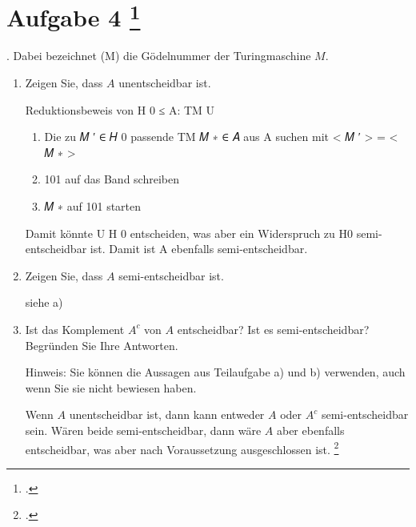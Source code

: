 \documentclass{lehramt-informatik-aufgabe}
\begin{document}
\section{Aufgabe 4
\footcite{examen:66115:2020:03}}


.
Dabei bezeichnet (M) die Gödelnummer der Turingmaschine $M$.
\begin{enumerate}


\item Zeigen Sie, dass $A$ unentscheidbar ist.

\begin{liAntwort}
Reduktionsbeweis von H 0 ≤ A:
TM U
\begin{enumerate}

\item Die zu 𝑀 ′ ∈ 𝐻 0 passende TM 𝑀 ∗ ∈ 𝐴 aus A suchen mit < 𝑀 ′ > = < 𝑀 ∗ >
\item 101 auf das Band schreiben
\item 𝑀 ∗ auf 101 starten
\end{enumerate}
Damit könnte U H 0 entscheiden, was aber ein Widerspruch zu H0 semi-
entscheidbar ist. Damit ist A ebenfalls semi-entscheidbar.
\end{liAntwort}


\item Zeigen Sie, dass $A$ semi-entscheidbar ist.

\begin{liAntwort}
siehe a)
\end{liAntwort}


\item Ist das Komplement $A^c$ von $A$ entscheidbar? Ist es semi-entscheidbar? Begründen
Sie Ihre Antworten.

Hinweis: Sie können die Aussagen aus Teilaufgabe a) und b) verwenden, auch wenn Sie sie
nicht bewiesen haben.

\begin{liAntwort}
Wenn $A$ unentscheidbar ist, dann kann entweder $A$ oder $A^c$
semi-entscheidbar sein. Wären beide semi-entscheidbar, dann wäre $A$
aber ebenfalls entscheidbar, was aber nach Voraussetzung ausgeschlossen
ist.
\footcite[Seite 52]{theo:fs:4}
\end{liAntwort}

\end{enumerate}
\end{document}
